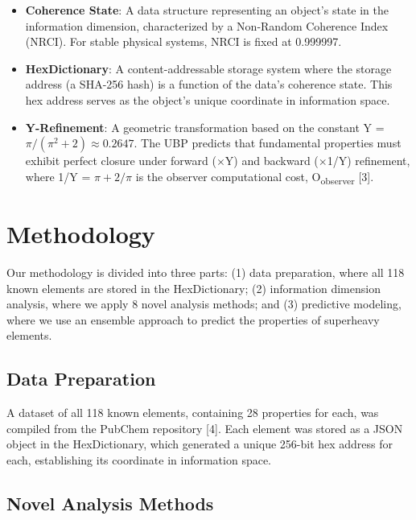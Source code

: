 \documentclass[12pt, a4paper]{article}
\begin{document}
\begin{itemize}
    \item \textbf{Coherence State}: A data structure representing an object's state in the information dimension, characterized by a Non-Random Coherence Index (NRCI). For stable physical systems, NRCI is fixed at 0.999997.
    \item \textbf{HexDictionary}: A content-addressable storage system where the storage address (a SHA-256 hash) is a function of the data's coherence state. This hex address serves as the object's unique coordinate in information space.
    \item \textbf{Y-Refinement}: A geometric transformation based on the constant Y = $\pi / (\pi^2 + 2) \approx 0.2647$. The UBP predicts that fundamental properties must exhibit perfect closure under forward ($\times$Y) and backward ($\times$1/Y) refinement, where 1/Y = $\pi + 2/\pi$ is the observer computational cost, O\textsubscript{observer} [3].
\end{itemize}


\section{Methodology}

Our methodology is divided into three parts: (1) data preparation, where all 118 known elements are stored in the HexDictionary; (2) information dimension analysis, where we apply 8 novel analysis methods; and (3) predictive modeling, where we use an ensemble approach to predict the properties of superheavy elements.

\subsection{Data Preparation}

A dataset of all 118 known elements, containing 28 properties for each, was compiled from the PubChem repository [4]. Each element was stored as a JSON object in the HexDictionary, which generated a unique 256-bit hex address for each, establishing its coordinate in information space.

\subsection{Novel Analysis Methods}
\end{document}
